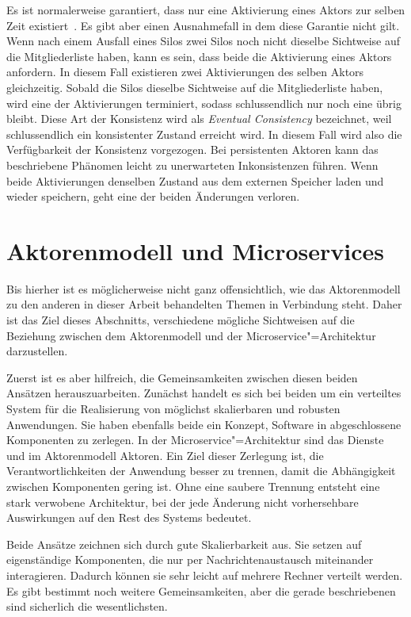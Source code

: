 Es ist normalerweise garantiert, dass nur eine Aktivierung eines Aktors zur selben Zeit existiert~\cite{Bernstein2014}. Es gibt aber einen Ausnahmefall in dem diese Garantie nicht gilt. Wenn nach einem Ausfall eines Silos zwei Silos noch nicht dieselbe Sichtweise auf die Mitgliederliste haben, kann es sein, dass beide die Aktivierung eines Aktors anfordern. In diesem Fall existieren zwei Aktivierungen des selben Aktors gleichzeitig. Sobald die Silos dieselbe Sichtweise auf die Mitgliederliste haben, wird eine der Aktivierungen terminiert, sodass schlussendlich nur noch eine übrig bleibt. Diese Art der Konsistenz wird als \textit{Eventual Consistency} bezeichnet, weil schlussendlich ein konsistenter Zustand erreicht wird. In diesem Fall wird also die Verfügbarkeit der Konsistenz vorgezogen. Bei persistenten Aktoren kann das beschriebene Phänomen leicht zu unerwarteten Inkonsistenzen führen. Wenn beide Aktivierungen denselben Zustand aus dem externen Speicher laden und wieder speichern, geht eine der beiden Änderungen verloren.

\section{Aktorenmodell und Microservices}

Bis hierher ist es möglicherweise nicht ganz offensichtlich, wie das Aktorenmodell zu den anderen in dieser Arbeit behandelten Themen in Verbindung steht. Daher ist das Ziel dieses Abschnitts, verschiedene mögliche Sichtweisen auf die Beziehung zwischen dem Aktorenmodell und der Microservice"=Architektur darzustellen.

Zuerst ist es aber hilfreich, die Gemeinsamkeiten zwischen diesen beiden Ansätzen herauszuarbeiten. Zunächst handelt es sich bei beiden um ein verteiltes System für die Realisierung von möglichst skalierbaren und robusten Anwendungen. Sie haben ebenfalls beide ein Konzept, Software in abgeschlossene Komponenten zu zerlegen. In der Microservice"=Architektur sind das Dienste und im Aktorenmodell Aktoren. Ein Ziel dieser Zerlegung ist, die Verantwortlichkeiten der Anwendung besser zu trennen, damit die Abhängigkeit zwischen Komponenten gering ist. Ohne eine saubere Trennung entsteht eine stark verwobene Architektur, bei der jede Änderung nicht vorhersehbare Auswirkungen auf den Rest des Systems bedeutet. 

Beide Ansätze zeichnen sich durch gute Skalierbarkeit aus. Sie setzen auf eigenständige Komponenten, die nur per Nachrichtenaustausch miteinander interagieren. Dadurch können sie sehr leicht auf mehrere Rechner verteilt werden. Es gibt bestimmt noch weitere Gemeinsamkeiten, aber die gerade beschriebenen sind sicherlich die wesentlichsten. 

